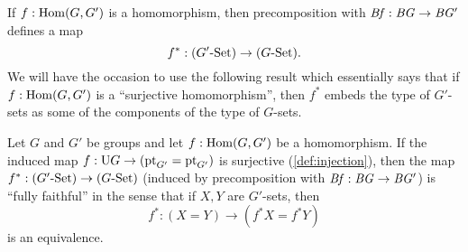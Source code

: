 If $f:\Hom(G,G')$ is a homomorphism, then precomposition with $\mathit{B}\mathit{f}:\mathit{B}\mathit{G}\to \mathit{B}\mathit{G}'$ defines a map $$f^*:(G'\text{-}\mathrm{Set})\to(G\text{-}\mathrm{Set}).$$
We will have the occasion to use the following result which essentially says that if $f:\Hom(G,G')$ is a ``surjective homomorphism'', then $f^*$ embeds the type of $G'$-sets as some of the components of the type of $G$-sets.
\begin{lemma}
  \label{lem:epifullyfaithful}
  Let $G$ and $G'$ be groups and let $f:\Hom(G,G')$ be a homomorphism.  If the induced map $f:\mathrm{U} G\to(\mathrm{pt}_{G'}=\mathrm{pt}_{G'})$ is surjective (\cf \cref{def:injection}), then the map $f^*:(G'\text{-}\mathrm{Set})\to(G\text{-}\mathrm{Set})$ (induced by precomposition with $\mathit{B}\mathit{f}:\mathit{B}\mathit{G}\to \mathit{B}\mathit{G}'$) is ``fully faithful'' in the sense that if $X,Y$ are $G'$-sets, then
$$f^*:(X=Y)\to(f^*X=f^*Y)
$$
is an equivalence.
\end{lemma}
